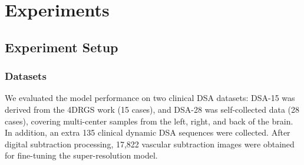 \documentclass[runningheads]{llncs}
\begin{document}
\section{Experiments} %
\subsection{Experiment Setup}%
\subsubsection{Datasets}We evaluated the model performance on two clinical DSA datasets: DSA-15 was derived from the 4DRGS work (15 cases), and DSA-28 was self-collected data (28 cases), covering multi-center samples from the left, right, and back of the brain. In addition, an extra 135 clinical dynamic DSA sequences were collected. After digital subtraction processing, 17,822 vascular subtraction images were obtained for fine-tuning the super-resolution model.
\end{document}
